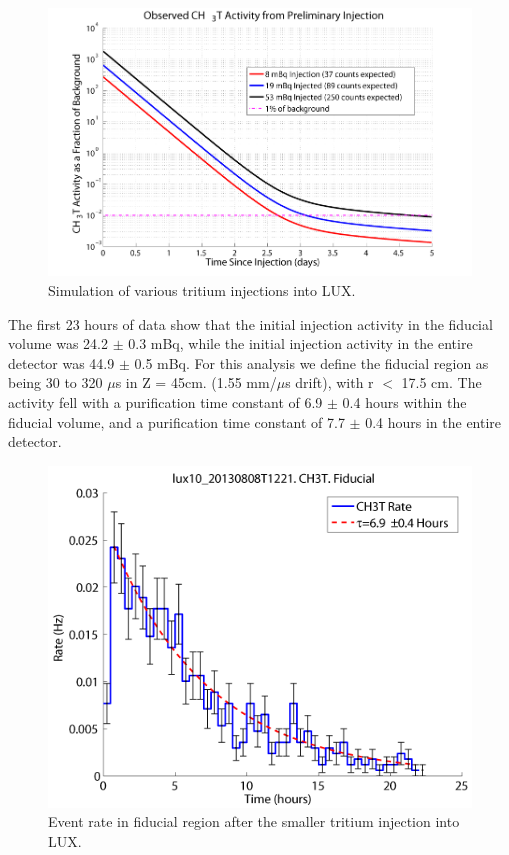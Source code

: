 \begin{figure}[H]
\centering
\includegraphics[scale=0.2]{LUX_prelimCH3T.png}
\caption{Simulation of various tritium injections into LUX.}
\label{fig:LUXPrelim}
\end{figure}

The first 23 hours of data show that the initial injection activity in the fiducial volume was 24.2 $\pm$ 0.3 mBq, while the initial injection activity in the entire detector was 44.9 $\pm$ 0.5 mBq.  For this analysis we define the fiducial region as being 30 to 320 $\mu$s in Z = 45cm. (1.55 mm/$\mu$s drift), with r $<$ 17.5 cm. The activity fell with a purification time constant of 6.9 $\pm$ 0.4 hours within the fiducial volume, and a purification time constant of 7.7 $\pm$ 0.4 hours in the entire detector.  

\begin{figure}[H]
\centering
\includegraphics[scale=0.25]{CH3T_fid_rate_new.png}
\caption{Event rate in fiducial region after the smaller tritium injection into LUX.}
\label{fig:FidRate}
\end{figure}

